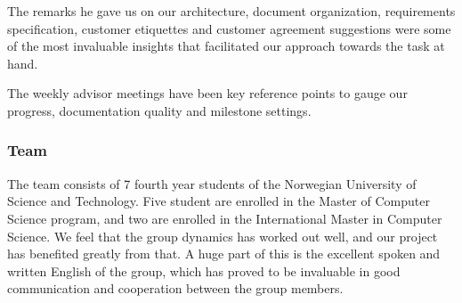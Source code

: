 The remarks he gave us on our architecture, document organization, requirements specification, customer etiquettes and customer agreement suggestions were some of the most invaluable insights that facilitated our approach towards the task at hand.

The weekly advisor meetings have been key reference points to gauge our progress, documentation quality and milestone settings.
	\subsubsection{Team}
  The team consists of 7 fourth year students of the Norwegian University of Science and Technology. Five student are enrolled in the Master of Computer Science program, and two are enrolled in the International Master in Computer Science. We feel that the group dynamics has worked out well, and our project has benefited greatly from that. A huge part of this is the excellent spoken and written English of the group, which has proved to be invaluable in good communication and cooperation between the group members.



